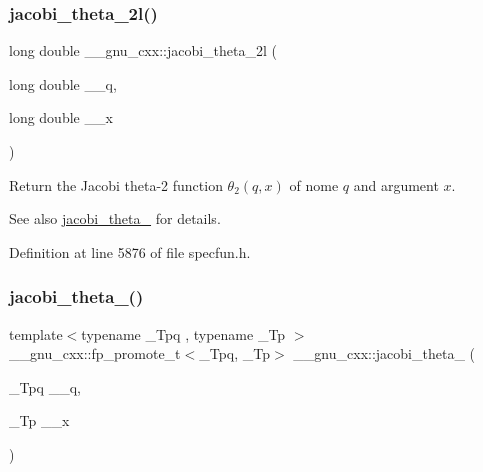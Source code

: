 \subsubsection{\texorpdfstring{jacobi\+\_\+theta\+\_\+2l()}{jacobi\_theta\_2l()}}
{\footnotesize\ttfamily long double \+\_\+\+\_\+gnu\+\_\+cxx\+::jacobi\+\_\+theta\+\_\+2l (\begin{DoxyParamCaption}\item[{long double}]{\+\_\+\+\_\+q,  }\item[{long double}]{\+\_\+\+\_\+x }\end{DoxyParamCaption})\hspace{0.3cm}{\ttfamily [inline]}}

Return the Jacobi theta-\/2 function $ \theta_2(q,x) $ of nome $ q $ and argument $ x $.

\begin{DoxySeeAlso}{See also}
\hyperlink{group__gnu__math__spec__func_gaf6b13dac1f112a870299d75cb4cf42cc}{jacobi\+\_\+theta\+\_} for details. 
\end{DoxySeeAlso}


Definition at line 5876 of file specfun.\+h.

\mbox{\label{group__gnu__math__spec__func_gaf4eac2990db1dadba66ae688ceaa6403}} 
\subsubsection{\texorpdfstring{jacobi\+\_\+theta\+\_()}{jacobi\_theta\_3()}}
{\footnotesize\ttfamily template$<$typename \+\_\+\+Tpq , typename \+\_\+\+Tp $>$ \\
\+\_\+\+\_\+gnu\+\_\+cxx\+::fp\+\_\+promote\+\_\+t$<$\+\_\+\+Tpq, \+\_\+\+Tp$>$ \+\_\+\+\_\+gnu\+\_\+cxx\+::jacobi\+\_\+theta\+\_ (\begin{DoxyParamCaption}\item[{\+\_\+\+Tpq}]{\+\_\+\+\_\+q,  }\item[{\+\_\+\+Tp}]{\+\_\+\+\_\+x }\end{DoxyParamCaption})\hspace{0.3cm}{\ttfamily [inline]}}

